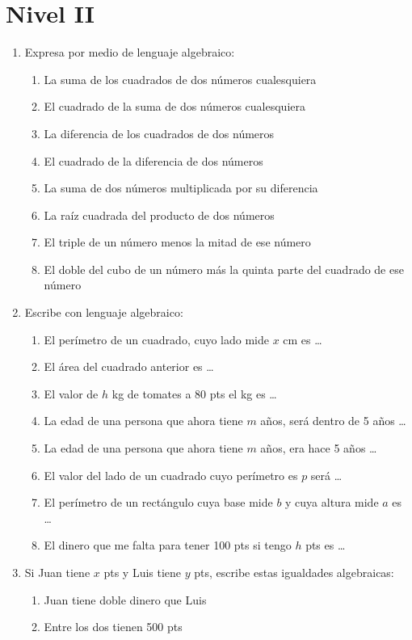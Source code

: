 \documentclass[10pt,twoside]{article}
\begin{document}
\section*{Nivel II}
\begin{enumerate}
\item Expresa por medio de lenguaje algebraico:
\begin{enumerate}
\item La suma de los cuadrados de dos números cualesquiera
\item El cuadrado de la suma de dos números cualesquiera
\item La diferencia de los cuadrados de dos números
\item El cuadrado de la diferencia de dos números
\item La suma de dos números multiplicada por su diferencia
\item La raíz cuadrada del producto de dos números
\item El triple de un número menos la mitad de ese número
\item El doble del cubo de un número más la quinta parte del cuadrado de ese número
\end{enumerate}
\item Escribe con lenguaje algebraico:
\begin{enumerate}
\item El perímetro de un cuadrado, cuyo lado mide $x$ cm es \ldots
\item El área del cuadrado anterior es \ldots
\item El valor de $h$ kg de tomates a 80 pts el kg es \ldots
\item La edad de una persona que ahora tiene $m$ años, será dentro de 5 años \ldots
\item La edad de una persona que ahora tiene $m$ años, era hace 5 años \ldots
\item El valor del lado de un cuadrado cuyo perímetro es $p$ será \ldots
\item El perímetro de un rectángulo cuya base mide $b$ y cuya altura mide $a$ es \ldots
\item El dinero que me falta para tener 100 pts si tengo $h$ pts es \ldots
\end{enumerate}
\item Si Juan tiene $x$ pts y Luis tiene $y$ pts, escribe estas igualdades algebraicas:
\begin{enumerate}
\item Juan tiene doble dinero que Luis
\item Entre los dos tienen 500 pts

\end{enumerate}
\end{enumerate}
\end{document}
